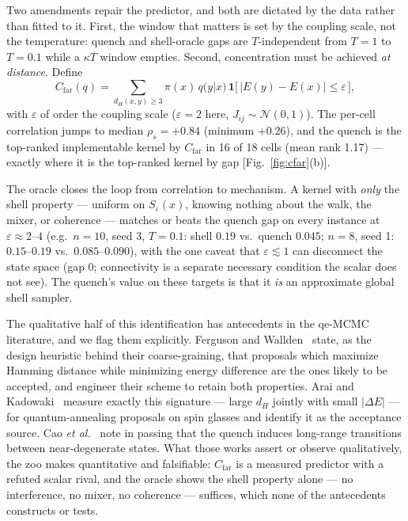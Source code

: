\documentclass[aps,prx,reprint,floatfix,amsmath,amssymb,amsfonts]{revtex4-2}
\begin{document}
Two amendments repair the predictor, and both are dictated by the data
rather than fitted to it. First, the window that matters is set by the
coupling scale, not the temperature: quench and shell-oracle gaps are
$T$-independent from $T=1$ to $T=0.1$ while a $\kappa T$ window empties.
Second, concentration must be achieved \emph{at distance}. Define
\begin{equation}
  C_{\mathrm{far}}(q)
  =
  \sum_{d_H(x,y)\ge 3} \pi(x)\, q(y|x)\,
  \mathbf{1}\bigl[\,|E(y)-E(x)| \le \varepsilon\,\bigr],
  \label{eq:cfar}
\end{equation}
with $\varepsilon$ of order the coupling scale ($\varepsilon=2$ here,
$J_{ij}\sim\mathcal N(0,1)$). The per-cell correlation jumps to median
$\rho_s=+0.84$ (minimum $+0.26$), and the quench is the top-ranked
implementable kernel by $C_{\mathrm{far}}$ in 16 of 18 cells (mean rank
1.17) --- exactly where it is the top-ranked kernel by gap
[Fig.~\ref{fig:cfar}(b)].

The oracle closes the loop from correlation to mechanism. A kernel with
\emph{only} the shell property --- uniform on $S_\varepsilon(x)$,
knowing nothing about the walk, the mixer, or coherence --- matches or
beats the quench gap on every instance at $\varepsilon\approx 2$--$4$
(e.g.\ $n=10$, seed 3, $T=0.1$: shell $0.19$ vs.\ quench $0.045$; $n=8$,
seed 1: $0.15$--$0.19$ vs.\ $0.085$--$0.090$), with the one caveat that
$\varepsilon\lesssim 1$ can disconnect the state space (gap $0$;
connectivity is a separate necessary condition the scalar does not see).
The quench's value on these targets is that it \emph{is} an approximate
global shell sampler.

The qualitative half of this identification has antecedents in the
qe-MCMC literature, and we flag them explicitly. Ferguson and
Wallden~\cite{Ferguson2025} state, as the design heuristic behind
their coarse-graining, that proposals which maximize Hamming distance
while minimizing energy difference are the ones likely to be accepted,
and engineer their scheme to retain both properties. Arai and
Kadowaki~\cite{AraiKadowaki2025} measure exactly this signature ---
large $d_H$ jointly with small $|\Delta E|$ --- for quantum-annealing
proposals on spin glasses and identify it as the acceptance source.
Cao \emph{et al.}~\cite{Cao2026} note in passing that the quench
induces long-range transitions between near-degenerate states. What
those works assert or observe qualitatively, the zoo makes
quantitative and falsifiable: $C_{\mathrm{far}}$ is a measured
predictor with a refuted scalar rival, and the oracle shows the shell
property alone --- no interference, no mixer, no coherence ---
suffices, which none of the antecedents constructs or tests.
\end{document}
